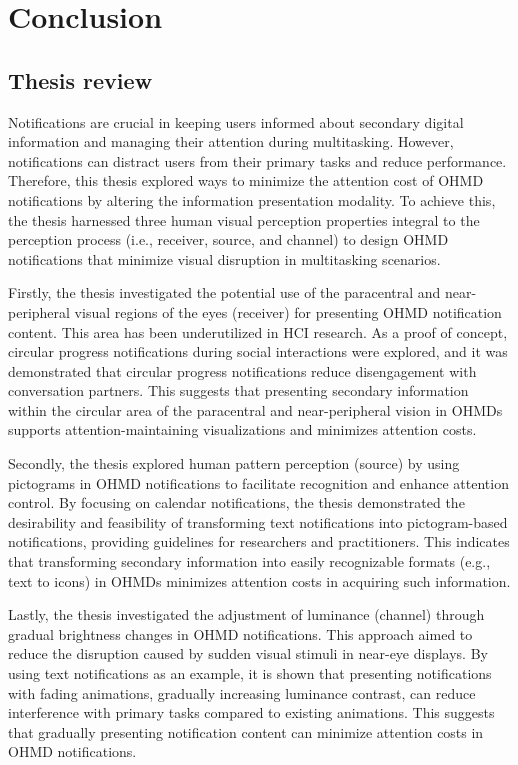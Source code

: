 \chapter{Conclusion}
\label{ch:Conclusion}

\section{Thesis review}

Notifications are crucial in keeping users informed about secondary digital information and managing their attention during multitasking. However, notifications can distract users from their primary tasks and reduce performance. Therefore, this thesis explored ways to minimize the attention cost of OHMD notifications by altering the information presentation modality. To achieve this, the thesis harnessed three human visual perception properties integral to the perception process (i.e., receiver, source, and channel) to design OHMD notifications that minimize visual disruption in multitasking scenarios.

Firstly, the thesis investigated the potential use of the paracentral and near-peripheral visual regions of the eyes (receiver) for presenting OHMD notification content. This area has been underutilized in HCI research. As a proof of concept, circular progress notifications during social interactions were explored, and it was demonstrated that circular progress notifications reduce disengagement with conversation partners. This suggests that presenting secondary information within the circular area of the paracentral and near-peripheral vision in OHMDs supports attention-maintaining visualizations and minimizes attention costs.


Secondly, the thesis explored human pattern perception (source) by using pictograms in OHMD notifications to facilitate recognition and enhance attention control. By focusing on calendar notifications, the thesis demonstrated the desirability and feasibility of transforming text notifications into pictogram-based notifications, providing guidelines for researchers and practitioners. This indicates that transforming secondary information into easily recognizable formats (e.g., text to icons) in OHMDs minimizes attention costs in acquiring such information.

Lastly, the thesis investigated the adjustment of luminance (channel) through gradual brightness changes in OHMD notifications. This approach aimed to reduce the disruption caused by sudden visual stimuli in near-eye displays. By using text notifications as an example, it is shown that presenting notifications with fading animations, gradually increasing luminance contrast, can reduce interference with primary tasks compared to existing animations. This suggests that gradually presenting notification content can minimize attention costs in OHMD notifications.

